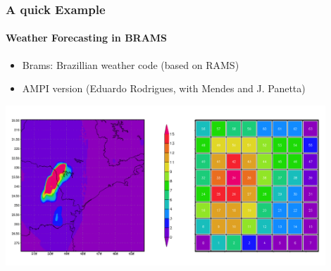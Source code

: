 

\begin{frame}[fragile]
\frametitle{A quick Example}
\framesubtitle{Weather Forecasting in BRAMS}
\begin{itemize}
 \item Brams: Brazillian weather code (based on RAMS)
 \item AMPI version (Eduardo Rodrigues, with Mendes and J. Panetta)
\end{itemize}
\includegraphics[width=0.9\textwidth]{figures/bramsVisual.png}
\end{frame}


